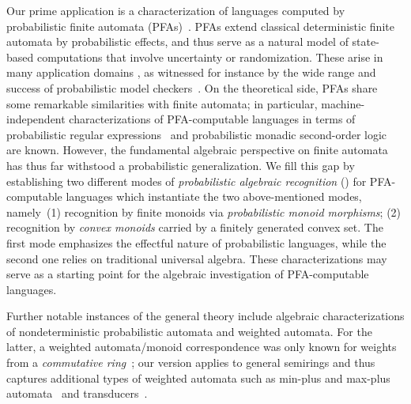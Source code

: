 \documentclass[a4paper, UKenglish, numberwithinsect, thm-restate, cleveref, final]{lipics-v2021}
\theoremstyle{plain}
\theoremstyle{definition}
\numberwithin{equation}{section}
\begin{document}
Our prime application is a characterization of languages computed by probabilistic finite automata (PFAs)~\cite{Rabin63}. PFAs extend classical deterministic finite automata
by probabilistic effects, and thus serve as a natural model of state-based computations that involve uncertainty or randomization. These arise in many application domains \cite{paz1971,DBLP:books/daglib/0020348}, as witnessed for instance by the wide range and success of probabilistic model checkers~\cite{KNP11,DBLP:journals/sttt/HenselJKQV22}. On the theoretical side, PFAs share some remarkable similarities with finite automata; in particular, machine-independent characterizations of PFA-computable languages in terms of probabilistic regular expressions~\cite{bgmz12,rs24} and probabilistic monadic second-order logic~\cite{weidner-12} are known. However, the fundamental algebraic perspective on finite automata has thus far withstood a probabilistic generalization. We fill this gap by establishing two different modes of \emph{probabilistic algebraic recognition} () for PFA-computable languages which instantiate the two above-mentioned modes, namely~(1) recognition by finite monoids via \emph{probabilistic monoid morphisms}; (2) recognition by \emph{convex monoids} carried by a finitely generated convex set.
The first mode emphasizes the effectful nature of probabilistic languages, while the second one relies on traditional universal algebra. These characterizations may serve as a starting point for the algebraic investigation of PFA-computable languages.

Further notable instances of the general theory include algebraic characterizations of nondeterministic probabilistic automata and weighted automata. For the latter, a weighted automata/monoid correspondence was only known for weights from a \emph{commutative ring}~\cite{reu80}; our version applies to general semirings and thus captures additional  types of weighted automata such as min-plus and max-plus automata~\cite[Ch.~5]{pin21_handbook} and transducers~\cite[Ch.~3]{pin21_handbook}.
\end{document}
